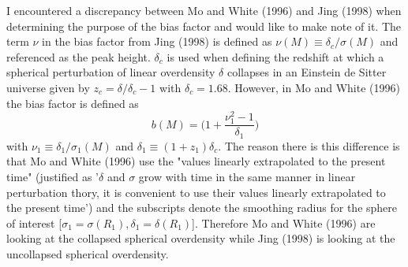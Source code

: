 \documentclass[12pt]{article}
\begin{document}
I encountered a discrepancy between Mo and White (1996) and Jing (1998) when determining the purpose of the bias factor and would like to make note of it. The term $\nu$ in the bias factor from Jing (1998) is defined as $\nu(M) \equiv \delta_c / \sigma(M)$ and referenced as the peak height. $\delta_c$ is used when defining the redshift at which a spherical perturbation of linear overdensity $\delta$ collapses in an Einstein de Sitter universe given by $z_c = \delta / \delta_c - 1$  with $\delta_c = 1.68$. However, in Mo and White (1996) the bias factor is defined as
\begin{equation} \label{MWbf}
b(M) = \Big (1 + \frac{\nu_1^2 - 1}{\delta_1} \Big )
\end{equation}
with $\nu_1 \equiv \delta_1 / \sigma_1(M)$ and $\delta_1 \equiv (1 + z_1)\delta_c$. The reason there is this difference is that Mo and White (1996) use the "values linearly extrapolated to the present time" (justified as '$\delta$ and $\sigma$ grow with time in the same manner in linear perturbation thory, it is convenient to use their values linearly extrapolated to the present time') and the subscripts denote the smoothing radius for the sphere of interest [$\sigma_1 = \sigma(R_1), \delta_1 = \delta(R_1)$]. Therefore Mo and White (1996) are looking at the collapsed spherical overdensity while Jing (1998) is looking at the uncollapsed spherical overdensity.
\end{document}
